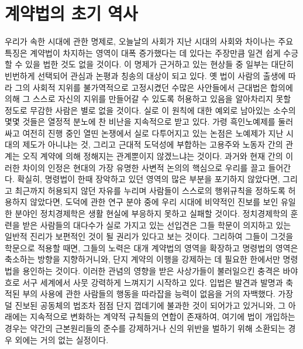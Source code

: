 \chapter{계약법의 초기 역사}

우리가 속한 시대에 관한 명제로,
오늘날의 사회가
지난 시대의 사회와 차이나는 주요 특징은
계약법이 차지하는 영역이 대폭 증가했다는 데 있다는
주장만큼
일견 쉽게 수긍할 수 있을 법한 것도 없을 것이다.
이 명제가 근거하고 있는 현상들 중 일부는
대단히 빈번하게 선택되어 관심과 논평과 칭송의 대상이 되고 있다.
옛 법이 사람의 출생에 따라 그의 사회적 지위를
불가역적으로 고정시켰던 수많은 사안들에서
근대법은 합의에 의해 그 스스로 자신의 지위를 만들어갈 수 있도록
허용하고 있음을
알아차리지 못할 정도로
무감한 사람은
별로 없을 것이다.
실로 이 원칙에 대한 예외로 남아있는 소수의 몇몇 것들은
열정적 분노에 찬 비난을 지속적으로 받고 있다.
가령 흑인노예제를 둘러싸고 여전히 진행 중인 열띤 논쟁에서
실로 다투어지고 있는 논점은
노예제가 지난 시대의 제도가 아니냐는 것,
그리고
근대적 도덕성에 부합하는
고용주와 노동자 간의 관계는
오직 계약에 의해 정해지는 관계뿐이지 않겠느냐는 것이다.
과거와 현재 간의 이러한 차이의 인정은
현대의 가장 유명한 사변적 논의의 핵심으로 우리를 끌고 들어간다.
확실히,
명령법이
한때 장악하고 있던 영역의 많은 부분을
포기하지 않았다면,
그리고
최근까지 허용되지 않던 자유를 누리며
사람들이 스스로의 행위규칙을 정하도록 허용하지 않았다면,
도덕에 관한 연구 분야 중에
우리 시대에 비약적인 진보를 보인 유일한 분야인
정치경제학은
생활 현실에 부응하지 못하고 실패할 것이다.
정치경제학의 훈련을 받은 사람들의 대다수가
실로 가지고 있는 선입견은
그들 학문이 의지하고 있는 일반적 진리가
보편적인 것이 될 권리가 있다고 보는 것이다.
그리하여 그들이 그것을 학문으로 적용할 때면,
그들의 노력은 대개 계약법의 영역을 확장하고
명령법의 영역은 축소하는 방향을 지향하거니와,
단지 계약의 이행을 강제하는 데 필요한 한에서만
명령법을 용인하는 것이다.
이러한 관념의 영향을 받은 사상가들이 불러일으킨 충격은
바야흐로 서구 세계에서 사뭇 강력하게 느껴지기 시작하고 있다.
입법은
발견과 발명과 축적된 부의 사용에 관한 사람들의 행동을
따라잡을 능력이 없음을
거의 자백했다.
가장 덜 진보된 공동체의 법조차
점점 단지 껍데기에 불과한 것이 되어가고 있거니와,
그 아래에는
지속적으로 변화하는 계약적 규칙들의 연합이 존재하여,
여기에 법이 개입하는 경우는
약간의 근본원리들의 준수를 강제하거나
신의 위반을 벌하기 위해 소환되는 경우 외에는
거의 없는 실정이다.

